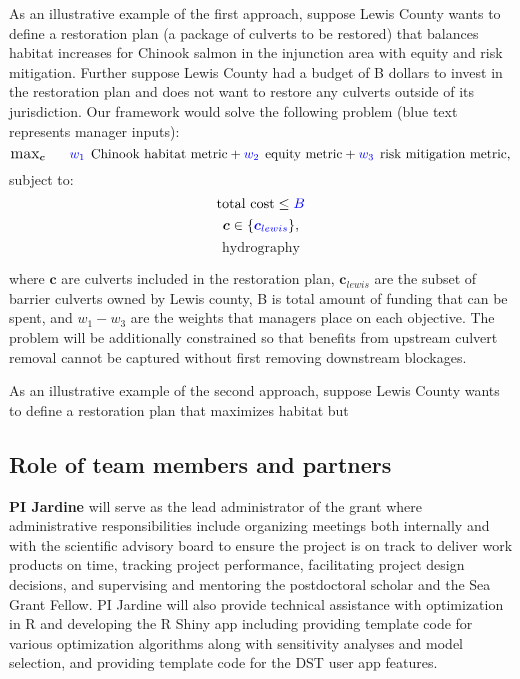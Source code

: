 \documentclass[12pt]{elsarticle}
\begin{document}
As an illustrative example of the first approach, suppose Lewis County wants to define a restoration plan (a package of culverts to be restored) that balances habitat increases for Chinook salmon in the injunction area with equity and risk mitigation. Further suppose Lewis County had a budget of B dollars to invest in the restoration plan and does not want to restore any culverts outside of its jurisdiction. Our framework would solve the following problem (blue text represents manager inputs):
\begin{equation*}
\substack{\text{\large max}}_{\boldsymbol{c}}\hspace{0.25in} \textcolor{blue}{w_1}\:\: \text{Chinook habitat metric} + \textcolor{blue}{w_2}\:\: \text{equity metric} + \textcolor{blue}{w_3}\:\: \text{risk mitigation metric},
\end{equation*}
\noindent subject to:  
\begin{equation*}
\text{total cost} \le \textcolor{blue}{B} 
\end{equation*}
\begin{equation*}
\boldsymbol{c} \in \{\textcolor{blue}{\boldsymbol{c}_{lewis}}  \},
\end{equation*}
\begin{equation*}
\text{hydrography}
\end{equation*}

where $\boldsymbol{c}$ are culverts included in the restoration plan, $\boldsymbol{c}_{lewis}$ are the subset of barrier culverts owned by Lewis county, B is total amount of funding that can be spent, and $w_1-w_3$ are the weights that managers place on each objective. The problem will be additionally constrained so that benefits from upstream culvert removal cannot be captured without first removing downstream blockages.

As an illustrative example of the second approach, suppose Lewis County wants to define a restoration plan that maximizes habitat but 



\subsection{Role of team members and partners}
\textbf{PI Jardine} will serve as the lead administrator of the grant where administrative responsibilities include organizing meetings both internally and with the scientific advisory board to ensure the project is on track to deliver work products on time, tracking project performance, facilitating project design decisions, and supervising and mentoring the postdoctoral scholar and the Sea Grant Fellow.  PI Jardine will also provide technical assistance with optimization in R and developing the R Shiny app including providing template code for various optimization algorithms along with sensitivity analyses and model selection, and providing template code for the DST user app features.\\
\end{document}
